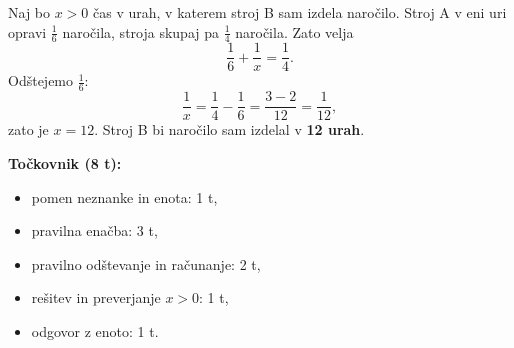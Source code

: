 \documentclass[11pt]{article}
\begin{document}
Naj bo $x>0$ čas v urah, v katerem stroj B sam izdela naročilo. Stroj A v eni uri opravi $\frac{1}{6}$ naročila, stroja skupaj pa $\frac{1}{4}$ naročila. Zato velja
\[
 \frac{1}{6}+\frac{1}{x}=\frac{1}{4}.
\]
Odštejemo $\frac{1}{6}$:
\[
 \frac{1}{x}=\frac{1}{4}-\frac{1}{6}=\frac{3-2}{12}=\frac{1}{12},
\]
zato je $x=12$. Stroj B bi naročilo sam izdelal v \textbf{12 urah}.

\textbf{Točkovnik (8 t):}
\vspace{0.35em}
\begin{itemize}[leftmargin=2.5em]
  \item pomen neznanke in enota: 1 t,
  \item pravilna enačba: 3 t,
  \item pravilno odštevanje in računanje: 2 t,
  \item rešitev in preverjanje $x>0$: 1 t,
  \item odgovor z enoto: 1 t.
\end{itemize}
\end{document}
